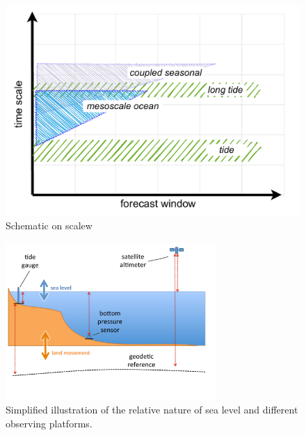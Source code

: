 \begin{frame}
\begin{figure}[h]\centering
  \includegraphics[width=130mm]{figures/diagrams/scales_focus.pdf}
  \caption{Schematic on scalew}
\end{figure}

\begin{figure}[h]\centering
  \includegraphics[width=80mm]{figures/diagrams/sealevel_cartoon.pdf}
  \caption{Simplified illustration of the relative nature of sea level and different observing platforms.}
  \label{fig:SEALEVEL}
\end{figure}



\end{frame}
